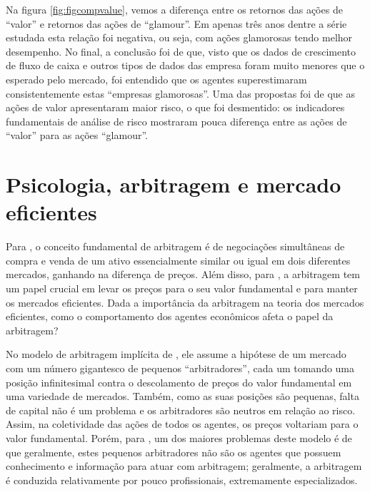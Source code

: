 Na figura \ref{fig:figcompvalue}, vemos a diferença entre os retornos das ações de “valor” e retornos das ações de “glamour”. Em apenas três anos dentre a série estudada esta relação foi negativa, ou seja, com ações glamorosas tendo melhor desempenho. No final, a conclusão foi de que, visto que os dados de crescimento de fluxo de caixa e outros tipos de dados das empresa foram muito menores que o esperado pelo mercado, foi entendido que os agentes superestimaram consistentemente estas “empresas glamorosas”. Uma das propostas foi de que as ações de valor apresentaram maior risco, o que foi desmentido: os indicadores fundamentais de análise de risco mostraram pouca diferença entre as ações de “valor” para as ações “glamour”.

\section{Psicologia, arbitragem e mercado eficientes}

Para , o conceito fundamental de arbitragem é de negociações simultâneas de compra e venda de um ativo essencialmente similar ou igual em dois diferentes mercados, ganhando na diferença de preços. Além disso, para , a arbitragem tem um papel crucial em levar os preços para o seu valor fundamental e para manter os mercados eficientes. Dada a importância da arbitragem na teoria dos mercados eficientes, como o comportamento dos agentes econômicos afeta o papel da arbitragem?

No modelo de arbitragem implícita de , ele assume a hipótese de um mercado com um número gigantesco de pequenos “arbitradores”, cada um tomando uma posição infinitesimal contra o descolamento de preços do valor fundamental em uma variedade de mercados. Também, como as suas posições são pequenas, falta de capital não é um problema e os arbitradores são neutros em relação ao risco. Assim, na coletividade das ações de todos os agentes, os preços voltariam para o valor fundamental. Porém, para , um dos maiores problemas deste modelo é de que geralmente, estes pequenos arbitradores não são os agentes que possuem conhecimento e informação para atuar com arbitragem; geralmente, a arbitragem é conduzida relativamente por pouco profissionais, extremamente especializados.

